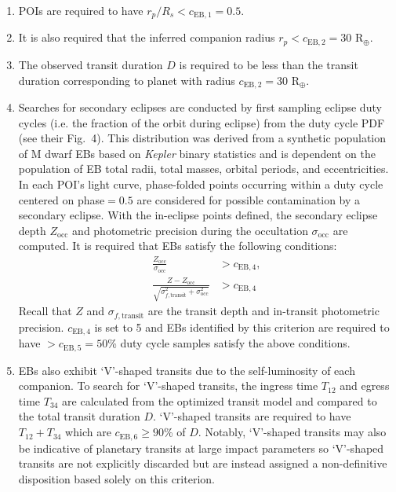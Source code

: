 \begin{enumerate}
\item POIs are required to have $r_p/R_s < c_{\text{EB},1}=0.5$.
\item It is also required that the inferred companion radius $r_p < c_{\text{EB},2}=30$
  R$_{\oplus}$.
\item The observed transit duration $D$ is required to be less than the transit
  duration corresponding to planet with radius $c_{\text{EB},2}=30$ R$_{\oplus}$.
\item Searches for secondary eclipses are conducted by first sampling eclipse duty cycles (i.e. the fraction of the
  orbit during eclipse) from the \cite{shan15} duty cycle PDF (see their Fig.~4). This distribution was
  derived from a synthetic population of M dwarf EBs based on \emph{Kepler} binary statistics and is
  dependent on the population of EB total radii, total masses, orbital periods, and eccentricities. In
  each POI's light curve, phase-folded points occurring within a duty cycle centered on
  phase$=0.5$ are considered for possible contamination by a secondary eclipse.
  With the in-eclipse points defined, the secondary eclipse depth $Z_{\text{occ}}$ and 
  photometric precision during the occultation $\sigma_{\text{occ}}$ are computed. It is required that EBs
  satisfy the following conditions:
  \begin{align}
    \frac{Z_{\text{occ}}}{\sigma_{\text{occ}}} &>c_{\text{EB},4}, \\
    \frac{Z-Z_{\text{occ}}}{\sqrt{\sigma_{f,\text{transit}}^2+\sigma_{\text{occ}}^2}} &>c_{\text{EB},4}
    \label{eq:occ}
  \end{align}
  \noindent Recall that $Z$ and $\sigma_{f,\text{transit}}$ are the transit depth and in-transit photometric
  precision. $c_{\text{EB},4}$ is set to 5 \citep{gunther17} and EBs identified by this criterion are required
  to have $>c_{\text{EB},5}=50$\% duty cycle samples satisfy the above conditions.
\item EBs also exhibit `V'-shaped transits due to the self-luminosity of each companion. To search for
  `V'-shaped transits, the ingress time $T_{12}$ and egress time $T_{34}$ are calculated from the
  optimized transit model and compared to the total transit duration $D$. 
  `V'-shaped transits are required to have $T_{12}+T_{34}$ which are $c_{\text{EB},6}\geq 90$\% of $D$.
  Notably, `V'-shaped transits may also be indicative of planetary transits at large impact parameters
  so `V'-shaped transits are not explicitly discarded but are instead assigned a
  non-definitive disposition based solely on this criterion.
\end{enumerate}


